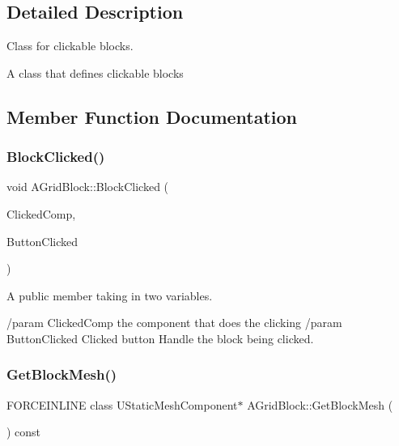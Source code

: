 \subsection{Detailed Description}
Class for clickable blocks. 

A class that defines clickable blocks 

\subsection{Member Function Documentation}
\hypertarget{class_a_grid_block_a359898585d272e8d3ca0216f880d3d25}{}\label{class_a_grid_block_a359898585d272e8d3ca0216f880d3d25} 
\subsubsection{\texorpdfstring{Block\+Clicked()}{BlockClicked()}}
{\footnotesize\ttfamily void A\+Grid\+Block\+::\+Block\+Clicked (\begin{DoxyParamCaption}\item[{U\+Primitive\+Component $\ast$}]{Clicked\+Comp,  }\item[{F\+Key}]{Button\+Clicked }\end{DoxyParamCaption})}



A public member taking in two variables. 

/param Clicked\+Comp the component that does the clicking /param Button\+Clicked Clicked button Handle the block being clicked. \hypertarget{class_a_grid_block_a88866015576480a21a82b9de762cfacf}{}\label{class_a_grid_block_a88866015576480a21a82b9de762cfacf} 
\subsubsection{\texorpdfstring{Get\+Block\+Mesh()}{GetBlockMesh()}}
{\footnotesize\ttfamily F\+O\+R\+C\+E\+I\+N\+L\+I\+NE class U\+Static\+Mesh\+Component$\ast$ A\+Grid\+Block\+::\+Get\+Block\+Mesh (\begin{DoxyParamCaption}{ }\end{DoxyParamCaption}) const\hspace{0.3cm}{\ttfamily [inline]}}



